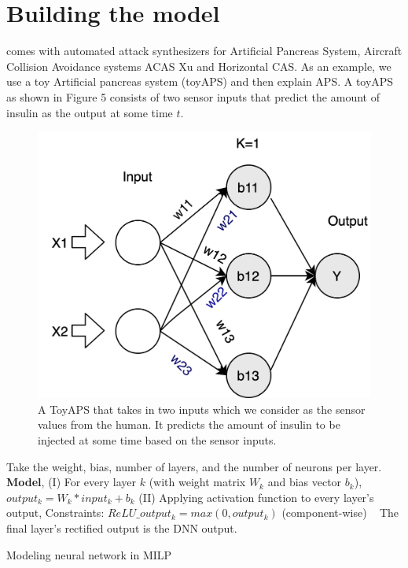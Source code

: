 \section{Building the model}
\label{section:attacks}
\tool comes with automated attack synthesizers for Artificial Pancreas System, Aircraft Collision Avoidance systems ACAS Xu and Horizontal CAS. %
As an example, we use a toy Artificial pancreas system (toyAPS) and then explain APS. A toyAPS as shown in Figure 5 consists of two sensor inputs that predict the amount of insulin as the output at some time $t$. 
\begin{figure}
	\centering
	\includegraphics[width=0.7\linewidth]{Images/ToyAPS}
	\caption[A ToyAPS]{A ToyAPS that takes in two inputs which we consider as the sensor values from the human. It predicts the amount of insulin to be injected at some time based on the sensor inputs.}
	\label{fig:toyaps}
\end{figure}


\begin{algorithm}
	Take the weight, bias, number of layers, and the number of neurons per layer. \\
	
	\textbf{Model}, \linebreak
	(I) For every layer $k$ (with weight matrix $W_k$ and bias vector $b_k$), $output_k = W_k * input_k + b_k$
	\linebreak
	(II) Applying activation function to every layer's output,
	\linebreak
	Constraints: $ReLU\_output_k = max(0, output_k)$ (component-wise) \
	\linebreak
	The final layer's rectified output is the DNN output.
	
	\caption{Modeling neural network in MILP}
	\label{algo:b}
\end{algorithm}

